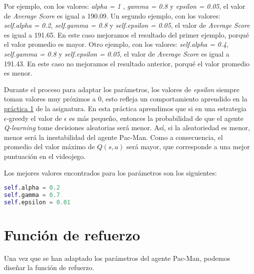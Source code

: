 \documentclass[11pt]{exam}
\begin{document}
Por ejemplo, con los valores: \textit{alpha = 1} , \textit{gamma = 0.8} y \textit{epsilon = 0.05}, el valor de \textit{Average Score} es igual a 190.09. Un segundo ejemplo, con los valores: \textit{self.alpha = 0.2}, \textit{self.gamma = 0.8} y \textit{self.epsilon = 0.05}, el valor de \textit{Average Score} es igual a 191.65. En este caso mejoramos el resultado del primer ejemplo, porqué el valor promedio es mayor. Otro ejemplo, con los valores: \textit{self.alpha = 0.4}, \textit{self.gamma = 0.8} y \textit{self.epsilon = 0.05}, el valor de \textit{Average Score} es igual a 191.43. En este caso no mejoramos el resultado anterior, porqué el valor promedio es menor.

Durante el proceso para adaptar los parámetros, los valores de \textit{epsilon} siempre toman valores muy próximos a 0, esto refleja un comportamiento aprendido en la \href{https://poliformat.upv.es/portal/site/ESP_0_2835/tool/c07b745a-0cfd-44f0-a7a2-9bb22f80c3f7?panel=Main}{práctica 1} de la asignatura. En esta práctica aprendimos que si en una estrategia $\epsilon$-greedy el valor de $\epsilon$ es más pequeño, entonces la probabilidad de que el agente \textit{Q-learning} tome decisiones aleatorias será menor. Así, si la aleatoriedad es menor, menor será la inestabilidad del agente Pac-Man. Como a consecuencia, el promedio del valor máximo de $Q(s,a)$ será mayor, que corresponde a una mejor puntuación en el videojego.
\vspace*{3mm}

Los mejores valores encontrados para los parámetros son los siguientes:

\begin{lstlisting}[language=python, basicstyle=\footnotesize]
self.alpha = 0.2
self.gamma = 0.7
self.epsilon = 0.01
\end{lstlisting}

\section{Función de refuerzo}\label{refuerzo}

Una vez que se han adaptado los parámetros del agente Pac-Man, podemos diseñar la función de refuerzo.
\end{document}
